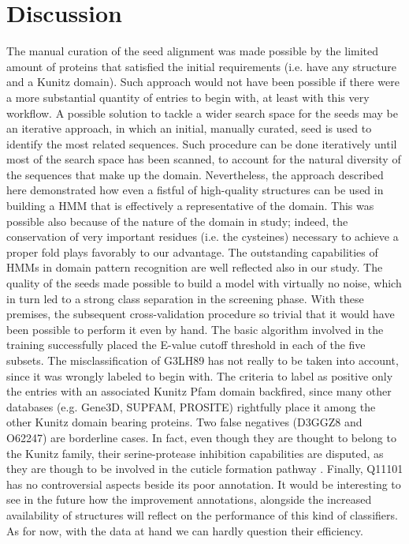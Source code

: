 \documentclass[nocrop]{bioinfo}
\begin{document}
\section{Discussion}
The manual curation of the seed alignment was made possible by the limited amount of proteins that satisfied the initial requirements (i.e. have any structure and a Kunitz domain).
Such approach would not have been possible if there were a more substantial quantity of entries to begin with, at least with this very workflow.
A possible solution to tackle a wider search space for the seeds may be an iterative approach, in which an initial, manually curated, seed is used to identify the most related sequences.
Such procedure can be done iteratively until most of the search space has been scanned, to account for the natural diversity of the sequences that make up the domain.
Nevertheless, the approach described here demonstrated how even a fistful of high-quality structures can be used in building a HMM that is effectively a representative of the domain.
This was possible also because of the nature of the domain in study; indeed, the conservation of very important residues (i.e. the cysteines) necessary to achieve a proper fold plays favorably to our advantage.
The outstanding capabilities of HMMs in domain pattern recognition are well reflected also in our study.
The quality of the seeds made possible to build a model with virtually no noise, which in turn led to a strong class separation in the screening phase.
With these premises, the subsequent cross-validation procedure so trivial that it would have been possible to perform it even by hand.
The basic algorithm involved in the training successfully placed the E-value cutoff threshold in each of the five subsets.
The misclassification of G3LH89 has not really to be taken into account, since it was wrongly labeled to begin with.
The criteria to label as positive only the entries with an associated Kunitz Pfam domain backfired, since many other databases (e.g. Gene3D, SUPFAM, PROSITE) rightfully place it among the other Kunitz domain bearing proteins.
Two false negatives (D3GGZ8 and O62247) are borderline cases.
In fact, even though they are thought to belong to the Kunitz family, their serine-protease inhibition capabilities are disputed, as they are though to be involved in the cuticle formation pathway \citep{pageBiosynthesisEnzymologyCaenorhabditis2006, stepekKunitzDomainProtein2010}.
Finally, Q11101 has no controversial aspects beside its poor annotation.
It would be interesting to see in the future how the improvement annotations, alongside the increased availability of structures will reflect on the performance of this kind of classifiers.
As for now, with the data at hand we can hardly question their efficiency.
\end{document}
